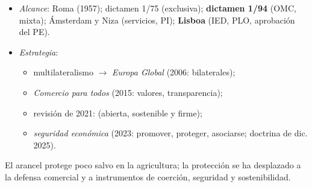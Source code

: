 \documentclass{article}
\begin{document}
\begin{columnas}
\begin{itemize}
\item \emph{Alcance}: Roma (1957); dictamen 1/75 (exclusiva); \textbf{dictamen 1/94} (OMC, mixta); Ámsterdam y Niza (servicios, PI); \textbf{Lisboa} (IED, PLO, aprobación del PE).
\item \emph{Estrategia}:
  \begin{itemize}
  \item multilateralismo $\to$ \emph{Europa Global} (2006: bilaterales);
  \item \emph{Comercio para todos} (2015: valores, transparencia);
  \item revisión de 2021:  (abierta, sostenible y firme);
  \item \emph{seguridad económica} (2023: promover, proteger, asociarse; doctrina de dic. 2025).
  \end{itemize}
\end{itemize}

\begin{ideaclave}
El arancel protege poco salvo en la agricultura; la protección se ha desplazado a la defensa comercial y a instrumentos de coerción, seguridad y sostenibilidad.
\end{ideaclave}


\end{columnas}
\end{document}
